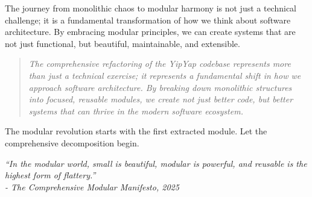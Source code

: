 \documentclass[11pt]{article}
\begin{document}
The journey from monolithic chaos to modular harmony is not just a technical challenge; it is a fundamental transformation of how we think about software architecture. By embracing modular principles, we can create systems that are not just functional, but beautiful, maintainable, and extensible.

\begin{quote}
\emph{The comprehensive refactoring of the YipYap codebase represents more than just a technical exercise; it represents a fundamental shift in how we approach software architecture. By breaking down monolithic structures into focused, reusable modules, we create not just better code, but better systems that can thrive in the modern software ecosystem.}
\end{quote}

The modular revolution starts with the first extracted module. Let the comprehensive decomposition begin.

\vfill

\textit{``In the modular world, small is beautiful, modular is powerful, and reusable is the highest form of flattery.''} \\
\textit{- The Comprehensive Modular Manifesto, 2025}
\end{document}

